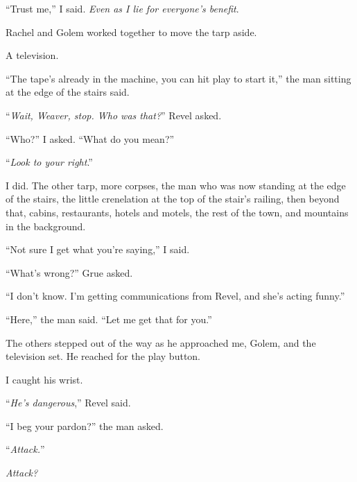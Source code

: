 ``Trust me,'' I said.  \emph{Even as I lie for everyone's benefit}.



Rachel and Golem worked together to move the tarp aside.



A television.



``The tape's already in the machine, you can hit play to start it,'' the man sitting at the edge of the stairs said.



``\emph{Wait, Weaver, stop.  Who was that?}''  Revel asked.



``Who?'' I asked.  ``What do you mean?''



``\emph{Look to your right}.''



I did.  The other tarp, more corpses, the man who was now standing at the edge of the stairs, the little crenelation at the top of the stair's railing, then beyond that, cabins, restaurants, hotels and motels, the rest of the town, and mountains in the background.



``Not sure I get what you're saying,'' I said.



``What's wrong?'' Grue asked.



``I don't know.  I'm getting communications from Revel, and she's acting funny.''



``Here,'' the man said.  ``Let me get that for you.''



The others stepped out of the way as he approached me, Golem, and the television set.  He reached for the play button.



I caught his wrist.



``\emph{He's dangerous},'' Revel said.



``I beg your pardon?'' the man asked.



``\emph{Attack.}''



\emph{Attack?}



